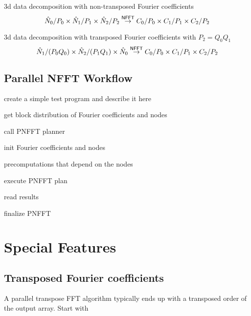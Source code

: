 3d data decomposition with non-transposed Fourier coefficients
\begin{equation*}
  \hat N_0 / P_0 \times \hat N_1 / P_1 \times \hat N_2 / P_2
  \overset{\textsf{\textsf{NFFT}}}{\rightarrow}
  C_0 / P_0 \times C_1 / P_1 \times C_2 / P_2
\end{equation*}

3d data decomposition with transposed Fourier coefficients with $P_2 = Q_0 Q_1$
\begin{equation*}
  \hat N_1 / (P_0 Q_0) \times \hat N_2 / (P_1 Q_1) \times \hat N_0
  \overset{\textsf{\textsf{NFFT}}}{\rightarrow}
  C_0 / P_0 \times C_1 / P_1 \times C_2 / P_2
\end{equation*}


\subsection{Parallel NFFT Workflow}

\begin{compactitem}
  \item create a simple test program and describe it here
\end{compactitem}


\begin{compactitem}
  \item get block distribution of Fourier coefficients and nodes
  \item call PNFFT planner
  \item init Fourier coefficients and nodes
  \item precomputations that depend on the nodes
  \item execute PNFFT plan
  \item read results
  \item finalize PNFFT
\end{compactitem}




\section{Special Features}


\subsection{Transposed Fourier coefficients}
A parallel transpose FFT algorithm typically ends up with a transposed order of the output array.
Start with


